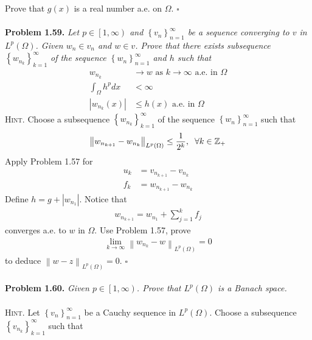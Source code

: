 \documentclass[a4paper]{article}
\numberwithin{equation}{section}
\begin{document}
Prove that $g\left(x\right)$ is a real number a.e. on $\Omega$. \hfill $\square$\\
\\
\textbf{Problem 1.59.} \textit{Let $p\in \left[1,\infty\right)$ and $\left\{ {{v_n}} \right\}_{n = 1}^\infty $ be a sequence converging to $v$ in $L^p\left(\Omega\right)$. Given $w_n\in v_n$ and $w\in v$. Prove that there exists subsequence $\left\{ {{w_{{n_k}}}} \right\}_{k = 1}^\infty $ of the sequence $\left\{ {{w_n}} \right\}_{n = 1}^\infty $ and $h$ such that}
\begin{align}
{w_{{n_k}}} &\to w\mbox{ as } k \to \infty \mbox{ a.e. in } \Omega \\
\int_\Omega  {{h^p}dx}  &< \infty \\
\left| {{w_{{n_k}}}\left( x \right)} \right| &\le h\left( x \right)\mbox{ a.e. in }\Omega 
\end{align}
\textsc{Hint.} Choose a subsequence $\left\{ {{w_{{n_k}}}} \right\}_{k = 1}^\infty $ of the sequence $\left\{ {{w_n}} \right\}_{n = 1}^\infty $ such that
\begin{align}
{\left\| {{w_{{n_{k + 1}}}} - {w_{{n_k}}}} \right\|_{{L^p}\left( \Omega  \right)}} \le \frac{1}{{{2^k}}},\hspace{0.2cm}\forall k \in {\mathbb{Z}_ + }
\end{align}
Apply Problem 1.57 for 
\begin{align}
{u_k} &= {v_{{n_{k + 1}}}} - {v_{{n_k}}}\\
{f_k} &= {w_{{n_{k + 1}}}} - {w_{{n_k}}}
\end{align}
Define $h = g + \left| {{w_{{n_1}}}} \right|$. Notice that
\begin{align}
{w_{{n_{k + 1}}}} = {w_{{n_1}}} + \sum\limits_{j = 1}^k {{f_j}} 
\end{align}
converges a.e. to $w$ in $\Omega$. Use Problem 1.57, prove
\begin{align}
\mathop {\lim }\limits_{k \to \infty } {\left\| {{w_{{n_k}}} - w} \right\|_{{L^p}\left( \Omega  \right)}} = 0
\end{align}
to deduce ${\left\| {w - z} \right\|_{{L^p}\left( \Omega  \right)}} = 0$. \hfill $\square$\\
\\
\textbf{Problem 1.60.} \textit{Given $p\in \left[1,\infty\right)$. Prove that $L^p\left(\Omega\right)$ is a Banach space.}\\
\\
\textsc{Hint.} Let $\left\{ {{v_n}} \right\}_{n = 1}^\infty $ be a Cauchy sequence in $L^p\left(\Omega\right)$. Choose a subsequence $\left\{ {{v_{{n_k}}}} \right\}_{k = 1}^\infty $ such that
\end{document}
